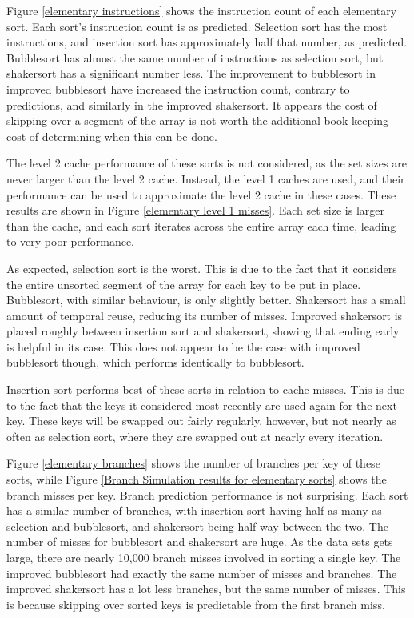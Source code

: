 Figure \ref{elementary instructions} shows the instruction count of each
elementary sort. Each sort's instruction count is as predicted. Selection sort
has the most instructions, and insertion sort has approximately half that
number, as predicted. Bubblesort has almost the same number of instructions as
selection sort, but shakersort has a significant number less. The improvement to
bubblesort in improved bubblesort have increased the instruction count, contrary to
predictions, and similarly in the improved shakersort. It appears the cost of
skipping over a segment of the array is not worth the additional book-keeping
cost of determining when this can be done.

The level 2 cache performance of these sorts is not considered, as the set sizes
are never larger than the level 2 cache. Instead, the level 1 caches are used,
and their performance can be used to approximate the level 2 cache in these
cases. These results are shown in Figure \ref{elementary level 1 misses}. Each
set size is larger than the cache, and each sort iterates across the entire
array each time, leading to very poor performance.

As expected, selection sort is the worst. This is due to the fact that it
considers the entire unsorted segment of the array for each key to be put in
place. Bubblesort, with similar behaviour, is only slightly better. Shakersort
has a small amount of temporal reuse, reducing its number of misses. Improved
shakersort is placed roughly between insertion sort and shakersort, showing that
ending early is helpful in its case. This does not appear to be the case with
improved bubblesort though, which performs identically to bubblesort.

Insertion sort performs best of these sorts in relation to cache misses. This
is due to the fact that the keys it considered most recently are used again for
the next key. These keys will be swapped out fairly regularly, however, but not
nearly as often as selection sort, where they are swapped out at nearly every
iteration.

Figure \ref{elementary branches} shows the number of branches per key of these
sorts, while Figure \ref{Branch Simulation results for elementary sorts} shows
the branch misses per key.  Branch prediction performance is not surprising.
Each sort has a similar number of branches, with insertion sort having half as
many as selection and bubblesort, and shakersort being half-way between the
two. The number of misses for bubblesort and shakersort are huge.  As the data
sets gets large, there are nearly 10,000 branch misses involved in sorting a
single key. The improved bubblesort had exactly the same number of misses and
branches. The improved shakersort has a lot less branches, but the same number
of misses. This is because skipping over sorted keys is predictable from the
first branch miss.

